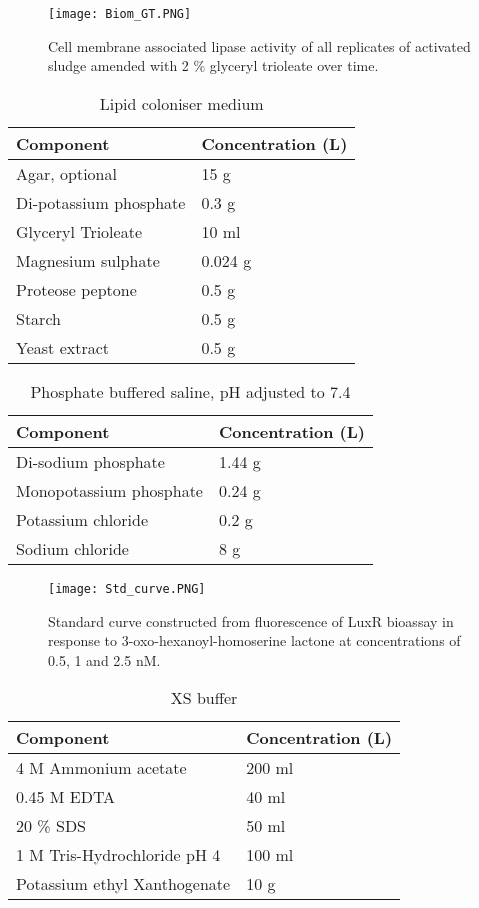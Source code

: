 \documentclass[twoside]{article}
\begin{document}
\begin{figure}
\texttt{[image: Biom\_GT.PNG]}
\caption{Cell membrane associated lipase activity of all replicates of activated sludge amended with 2 \% glyceryl trioleate over time.}
\end{figure}
\FloatBarrier

\begin{table}
\caption{Lipid coloniser medium}
\begin{tabular}{  p{6.9cm} | p{6.9cm} }
\hline
Component & Concentration (L) \\
\hline
Agar, optional  & 15 g  \\
  Di-potassium phosphate  & 0.3 g \\
   Glyceryl Trioleate   & 10 ml \\
      Magnesium sulphate  & 0.024 g  \\
       Proteose peptone   & 0.5 g \\
          Starch  & 0.5 g \\
           Yeast extract   & 0.5 g \\
  \hline
\end{tabular}
\end{table}


\begin{table}
\caption{Phosphate buffered saline, pH adjusted to 7.4}
\begin{tabular}{  p{6.9cm} | p{6.9cm}  }
\hline
Component & Concentration (L) \\
\hline
Di-sodium phosphate  & 1.44 g \\
  Monopotassium phosphate  & 0.24 g  \\
    Potassium chloride  &  0.2 g  \\
      Sodium chloride  & 8 g  \\
  \hline
\end{tabular}
\end{table}

\begin{figure}
\texttt{[image: Std\_curve.PNG]}
\caption{Standard curve constructed from fluorescence of LuxR bioassay in response to 3-oxo-hexanoyl-homoserine lactone at concentrations of 0.5, 1 and 2.5 nM.}
\end{figure}
\FloatBarrier

\begin{table}
\caption{XS buffer}
\begin{tabular}{  p{6.9cm} | p{6.9cm}  }
\hline
Component & Concentration (L) \\
\hline
 4 M Ammonium acetate & 200 ml  \\
  0.45 M EDTA  & 40 ml \\
    20 \% SDS  & 50 ml \\
    1 M Tris-Hydrochloride pH 4    & 100 ml  \\
        Potassium ethyl Xanthogenate  & 10 g  \\
  \hline
\end{tabular}
\end{table}
\end{document}

